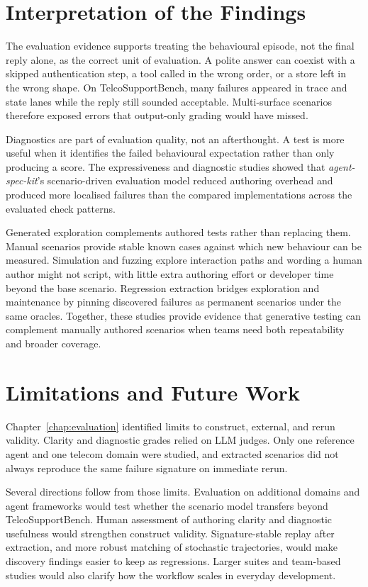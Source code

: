 \section{Interpretation of the Findings}

The evaluation evidence supports treating the behavioural episode, not the final reply alone, as the correct unit of evaluation. A polite answer can coexist with a skipped authentication step, a tool called in the wrong order, or a store left in the wrong shape. On TelcoSupportBench, many failures appeared in trace and state lanes while the reply still sounded acceptable. Multi-surface scenarios therefore exposed errors that output-only grading would have missed.

Diagnostics are part of evaluation quality, not an afterthought. A test is more useful when it identifies the failed behavioural expectation rather than only producing a score. The expressiveness and diagnostic studies showed that \emph{agent-spec-kit}'s scenario-driven evaluation model reduced authoring overhead and produced more localised failures than the compared implementations across the evaluated check patterns.

Generated exploration complements authored tests rather than replacing them. Manual scenarios provide stable known cases against which new behaviour can be measured. Simulation and fuzzing explore interaction paths and wording a human author might not script, with little extra authoring effort or developer time beyond the base scenario. Regression extraction bridges exploration and maintenance by pinning discovered failures as permanent scenarios under the same oracles. Together, these studies provide evidence that generative testing can complement manually authored scenarios when teams need both repeatability and broader coverage.

\section{Limitations and Future Work}

Chapter~\ref{chap:evaluation} identified limits to construct, external, and rerun validity. Clarity and diagnostic grades relied on LLM judges. Only one reference agent and one telecom domain were studied, and extracted scenarios did not always reproduce the same failure signature on immediate rerun.

Several directions follow from those limits. Evaluation on additional domains and agent frameworks would test whether the scenario model transfers beyond TelcoSupportBench. Human assessment of authoring clarity and diagnostic usefulness would strengthen construct validity. Signature-stable replay after extraction, and more robust matching of stochastic trajectories, would make discovery findings easier to keep as regressions. Larger suites and team-based studies would also clarify how the workflow scales in everyday development.

